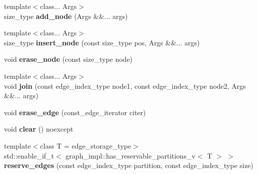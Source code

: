 \begin{DoxyCompactItemize}
\item 
\mbox{\label{classsequoia_1_1maths_1_1graph__base_afe1b1e38c88094c4ca9837502cff0c52}} 
{\footnotesize template$<$class... Args$>$ }\\size\+\_\+type {\bfseries add\+\_\+node} (Args \&\&... args)
\item 
\mbox{\label{classsequoia_1_1maths_1_1graph__base_a79d8a3fa997cad634d2eecd9ef319a1e}} 
{\footnotesize template$<$class... Args$>$ }\\size\+\_\+type {\bfseries insert\+\_\+node} (const size\+\_\+type pos, Args \&\&... args)
\item 
\mbox{\label{classsequoia_1_1maths_1_1graph__base_a768e22791d71f8b648aa012a251b51f2}} 
void {\bfseries erase\+\_\+node} (const size\+\_\+type node)
\item 
\mbox{\label{classsequoia_1_1maths_1_1graph__base_a2025970994d6fc6753a8d9da270455a5}} 
{\footnotesize template$<$class... Args$>$ }\\void {\bfseries join} (const edge\+\_\+index\+\_\+type node1, const edge\+\_\+index\+\_\+type node2, Args \&\&... args)
\item 
\mbox{\label{classsequoia_1_1maths_1_1graph__base_ae7f32aa03de23d5218719ef2d5d5aef2}} 
void {\bfseries erase\+\_\+edge} (const\+\_\+edge\+\_\+iterator citer)
\item 
\mbox{\label{classsequoia_1_1maths_1_1graph__base_a25d336e899f392297b103c8ada988287}} 
void {\bfseries clear} () noexcept
\item 
\mbox{\label{classsequoia_1_1maths_1_1graph__base_abd8653f95905e6f2045ca7d6de44a535}} 
{\footnotesize template$<$class T  = edge\+\_\+storage\+\_\+type$>$ }\\std\+::enable\+\_\+if\+\_\+t$<$ graph\+\_\+impl\+::has\+\_\+reservable\+\_\+partitions\+\_\+v$<$ T $>$ $>$ {\bfseries reserve\+\_\+edges} (const edge\+\_\+index\+\_\+type partition, const edge\+\_\+index\+\_\+type size)
\item 

\end{DoxyCompactItemize}
